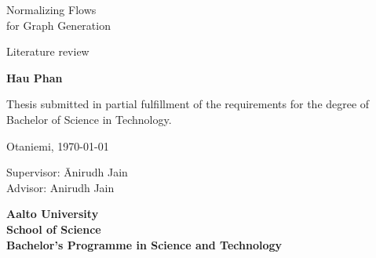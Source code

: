 {\parindent0pt %
	\begin{spacing}{1.1}

		 {\sffamily\lsstyle \the\year}
	\end{spacing}

	\vspace{12.7mm}

	\begin{spacing}{1.63}
		{\fontsize{17.8pt}{17.8pt}\selectfont Normalizing Flows \\for Graph Generation}
	\end{spacing}

	\vspace{10.5mm}

	\begin{spacing}{1.2}
		{\fontsize{13pt}{13pt}\selectfont Literature review}
	\end{spacing}

	\vspace{10.6mm}

	{\fontsize{13.9pt}{13.9pt}\bfseries\sffamily\lsstyle Hau Phan}

	\vfill

	{\fontsize{10.3pt}{10.3pt}\sffamily\lsstyle\raggedright
		\begin{spacing}{1.06}

			Thesis submitted in partial fulfillment of the requirements for the
			degree of Bachelor of Science in Technology.

			Otaniemi, \today

			\begin{tabbing}
				Supervisor:\hspace{6mm} \= Anirudh Jain \\
				Advisor: \> Anirudh Jain
			\end{tabbing}
			\vspace{-4mm}
		\end{spacing}
	} %

	\vspace{11.5mm}

	\begin{spacing}{.9}
		{\bfseries\sffamily\lsstyle Aalto University \\
			School of Science \\
			Bachelor’s Programme in Science and Technology}
	\end{spacing}
} %



